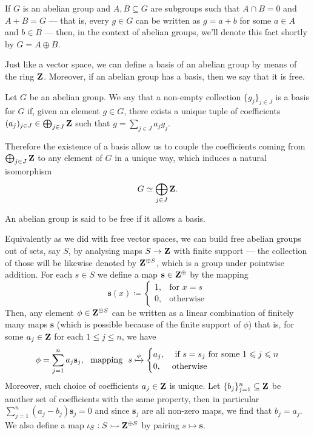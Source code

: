If \(G\) is an abelian group and \(A, B \subseteq G\) are subgroups such that
\(A \cap B = 0\) and \(A + B = G\) --- that is, every \(g \in G\) can be
written as \(g = a + b\) for some \(a \in A\) and \(b \in B\) --- then, in the
context of abelian groups, we'll denote this fact shortly by \(G = A \oplus B\).

Just like a vector space, we can define a basis of an abelian group by means of
the ring \(\Z\). Moreover, if an abelian group has a basis, then we say that it
is free.

\begin{definition}[Basis]
\label{def:Ab-basis}
Let \(G\) be an abelian group. We say that a non-empty collection
\(\{g_j\}_{j \in J}\) is a basis for \(G\) if, given an element \(g \in G\),
there exists a unique tuple of coefficients
\((a_j)_{j \in J} \in \bigoplus_{j \in J} \Z\) such that
\(g = \sum_{j \in J} a_j g_j\).
\end{definition}

Therefore the existence of a basis allow us to couple the coefficients coming
from \(\bigoplus_{j \in J} \Z\) to any element of \(G\) in a unique way, which
induces a natural isomorphism
\[
  G \iso \bigoplus_{j \in J} \Z.
\]

\begin{definition}\label{def:Ab-free}
An abelian group is said to be free if it allows a basis.
\end{definition}

Equivalently as we did with free vector spaces, we can build free abelian groups
out of sets, say \(S\), by analysing maps \(S \to \Z\) with finite support ---
the collection of those will be likewise denoted by \(\Z^{\oplus S}\), which is
a group under pointwise addition. For each \(s \in S\) we define a map
\(\mathbf{s} \in \Z^{\oplus}\) by the mapping
\[
  \mathbf{s}(x) \coloneq
  \begin{cases}
    1, &\text{for } x = s \\
    0, &\text{otherwise}
  \end{cases}
\]
Then, any element \(\phi \in \Z^{\oplus S}\) can be written as a linear
combination of finitely many maps \(\mathbf{s}\) (which is possible because of
the finite support of \(\phi\)) that is, for some \(a_j \in \Z\) for each
\(1 \leq j \leq n\), we have
\[
  \phi = \sum_{j=1}^n a_j \mathbf{s}_j,\ \text{ mapping }\
  s \xmapsto \phi
  \begin{cases}
    a_j, &\text{ if } s = s_j \text{ for some } 1 \leq j \leq n \\
    0, &\text{otherwise}
  \end{cases}
\]
Moreover, such choice of coefficients \(a_j \in \Z\) is unique. Let
\(\{b_{j}\}_{j=1}^n \subseteq \Z\) be another set of coefficients with the same
property, then in particular \(\sum_{j=1}^n (a_j - b_j) \mathbf{s}_j = 0\) and
since \(\mathbf{s}_j\) are all non-zero maps, we find that \(b_j = a_j\). We
also define a map \(\iota_S: S \mono \Z^{\oplus S}\) by pairing
\(s \mapsto \mathbf{s}\).

